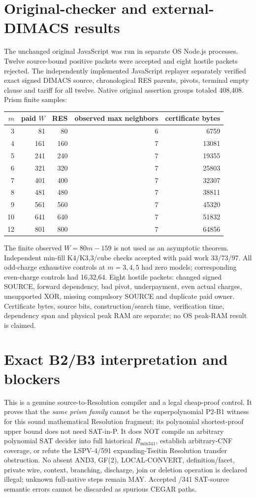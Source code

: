 \documentclass[11pt]{article}
\begin{document}
\section*{Original-checker and external-DIMACS results}
The unchanged original JavaScript was run in separate OS Node.js processes. Twelve source-bound positive packets were accepted and eight hostile packets rejected. The independently implemented JavaScript replayer separately verified exact signed DIMACS source, chronological RES parents, pivots, terminal empty clause and tariff for all twelve. Native original assertion groups totaled 408,408. Prism finite samples:
\begin{center}\begin{tabular}{rrrrr}\toprule
$m$ & paid $W$ & RES & observed max neighbors & certificate bytes\\\midrule
3&81&80&6&6759\\
4&161&160&7&13081\\
5&241&240&7&19355\\
6&321&320&7&25803\\
7&401&400&7&32307\\
8&481&480&7&38811\\
9&561&560&7&45320\\
10&641&640&7&51832\\
12&801&800&7&64856\\\bottomrule\end{tabular}\end{center}
The finite observed $W=80m-159$ is not used as an asymptotic theorem. Independent min-fill K4/K3,3/cube checks accepted with paid work 33/73/97. All odd-charge exhaustive controls at $m=3,4,5$ had zero models; corresponding even-charge controls had 16,32,64. Eight hostile packets: changed signed SOURCE, forward dependency, bad pivot, underpayment, even actual charges, unsupported XOR, missing compulsory SOURCE and duplicate paid owner. Certificate bytes, source bits, construction/search time, verification time, dependency span and physical peak RAM are separate; no OS peak-RAM result is claimed.

\section*{Exact B2/B3 interpretation and blockers}
This is a genuine source-to-Resolution compiler and a legal cheap-proof control. It proves that the \emph{same prism family} cannot be the superpolynomial P2-B1 witness for this sound mathematical Resolution fragment; its polynomial shortest-proof upper bound does not need SAT-in-P. It does NOT compile an arbitrary polynomial SAT decider into full historical $R_{\mathrm{mix341}}$, establish arbitrary-CNF coverage, or refute the LSPV-4/591 expanding-Tseitin Resolution transfer obstruction. No absent AND3, GF(2), LOCAL-CONVERT, definition/facet, private wire, context, branching, discharge, join or deletion operation is declared illegal; unknown full-native steps remain MAY. Accepted /341 SAT-source semantic errors cannot be discarded as spurious CEGAR paths.
\end{document}
